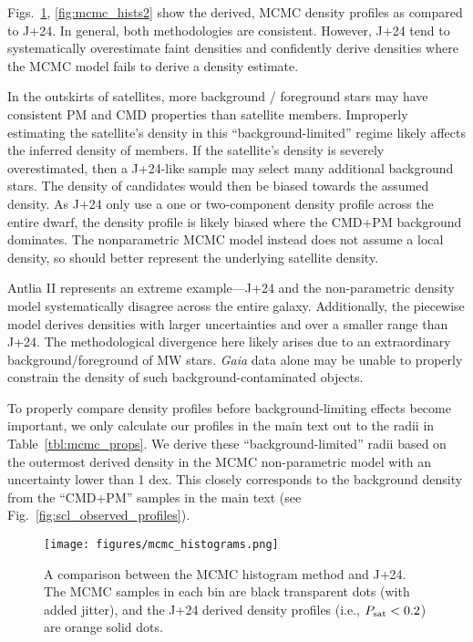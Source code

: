 Figs.~\ref{fig:mcmc_hists}, \ref{fig:mcmc_hists2} show the derived, MCMC
density profiles as compared to J+24. In general, both methodologies are
consistent. However, J+24 tend to systematically overestimate faint
densities and confidently derive densities where the MCMC model fails to
derive a density estimate.

In the outskirts of satellites, more background / foreground stars may
have consistent PM and CMD properties than satellite members. Improperly
estimating the satellite's density in this ``background-limited'' regime
likely affects the inferred density of members. If the satellite's
density is severely overestimated, then a J+24-like sample may select
many additional background stars. The density of candidates would then
be biased towards the assumed density. As J+24 only use a one or
two-component density profile across the entire dwarf, the density
profile is likely biased where the CMD+PM background dominates. The
nonparametric MCMC model instead does not assume a local density, so
should better represent the underlying satellite density.

Antlia II represents an extreme example---J+24 and the non-parametric
density model systematically disagree across the entire galaxy.
Additionally, the piecewise model derives densities with larger
uncertainties and over a smaller range than J+24. The methodological
divergence here likely arises due to an extraordinary
background/foreground of MW stars. \emph{Gaia} data alone may be unable
to properly constrain the density of such background-contaminated
objects.

To properly compare density profiles before background-limiting effects
become important, we only calculate our profiles in the main text out to
the radii in Table~\ref{tbl:mcmc_props}. We derive these
``background-limited'' radii based on the outermost derived density in
the MCMC non-parametric model with an uncertainty lower than 1 dex. This
closely corresponds to the background density from the ``CMD+PM''
samples in the main text (see Fig.~\ref{fig:scl_observed_profiles}).

\begin{figure}
\centering
\texttt{[image: figures/mcmc\_histograms.png]}
\caption[Probabilistic density profiles]{A comparison between the MCMC
histogram method and J+24. The MCMC samples in each bin are black
transparent dots (with added jitter), and the J+24 derived density
profiles (i.e., \(P_{\rm sat} < 0.2\)) are orange solid
dots.}\label{fig:mcmc_hists}
\end{figure}

